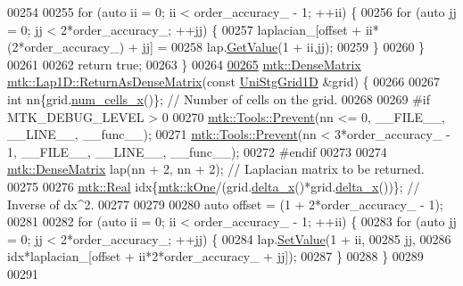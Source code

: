 \begin{DoxyCode}
00254 
00255   \textcolor{keywordflow}{for} (\textcolor{keyword}{auto} ii = 0; ii < order\_accuracy\_ - 1; ++ii) \{
00256     \textcolor{keywordflow}{for} (\textcolor{keyword}{auto} jj = 0; jj < 2*order\_accuracy\_; ++jj) \{
00257       laplacian\_[offset + ii*(2*order\_accuracy\_) + jj] =
00258         lap.\hyperlink{classmtk_1_1DenseMatrix_a87fb785713c04b13767947cc3325ce7c}{GetValue}(1 + ii,jj);
00259     \}
00260   \}
00261 
00262   \textcolor{keywordflow}{return} \textcolor{keyword}{true};
00263 \}
00264 
\hypertarget{mtk__lap__1d_8cc_source_l00265}{}\hyperlink{classmtk_1_1Lap1D_a28672c735fa0d13e6204795b63aec4e2}{00265} \hyperlink{classmtk_1_1DenseMatrix}{mtk::DenseMatrix} \hyperlink{classmtk_1_1Lap1D_a28672c735fa0d13e6204795b63aec4e2}{mtk::Lap1D::ReturnAsDenseMatrix}(\textcolor{keyword}{const} 
      \hyperlink{classmtk_1_1UniStgGrid1D}{UniStgGrid1D} &grid) \{
00266 
00267   \textcolor{keywordtype}{int} nn\{grid.\hyperlink{classmtk_1_1UniStgGrid1D_af1b3729d8afa07be5b2775ed68015b80}{num\_cells\_x}()\};  \textcolor{comment}{// Number of cells on the grid.}
00268 
00269 \textcolor{preprocessor}{  #if MTK\_DEBUG\_LEVEL > 0}
00270   \hyperlink{classmtk_1_1Tools_afe5bb096309258e2e72503fd7b41c7e0}{mtk::Tools::Prevent}(nn <= 0, \_\_FILE\_\_, \_\_LINE\_\_, \_\_func\_\_);
00271   \hyperlink{classmtk_1_1Tools_afe5bb096309258e2e72503fd7b41c7e0}{mtk::Tools::Prevent}(nn < 3*order\_accuracy\_ - 1, \_\_FILE\_\_, \_\_LINE\_\_, \_\_func\_\_);
00272 \textcolor{preprocessor}{  #endif}
00273 
00274   \hyperlink{classmtk_1_1DenseMatrix}{mtk::DenseMatrix} lap(nn + 2, nn + 2); \textcolor{comment}{// Laplacian matrix to be returned.}
00275 
00276   \hyperlink{group__c01-roots_gac080bbbf5cbb5502c9f00405f894857d}{mtk::Real} idx\{\hyperlink{group__c01-roots_ga26407c24d43b6b95480943340d285c71}{mtk::kOne}/(grid.\hyperlink{classmtk_1_1UniStgGrid1D_a6e7173b01241632cf509496d66b9f74c}{delta\_x}()*grid.\hyperlink{classmtk_1_1UniStgGrid1D_a6e7173b01241632cf509496d66b9f74c}{delta\_x}())\}; \textcolor{comment}{// Inverse of
       dx^2.}
00277 
00279 
00280   \textcolor{keyword}{auto} offset = (1 + 2*order\_accuracy\_ - 1);
00281 
00282   \textcolor{keywordflow}{for} (\textcolor{keyword}{auto} ii = 0; ii < order\_accuracy\_ - 1; ++ii) \{
00283     \textcolor{keywordflow}{for} (\textcolor{keyword}{auto} jj = 0; jj < 2*order\_accuracy\_; ++jj) \{
00284       lap.\hyperlink{classmtk_1_1DenseMatrix_ae0f873a6d3a734da467cafb817da64ae}{SetValue}(1 + ii,
00285                    jj,
00286                    idx*laplacian\_[offset + ii*2*order\_accuracy\_ + jj]);
00287     \}
00288   \}
00289 
00291 

\end{DoxyCode}
